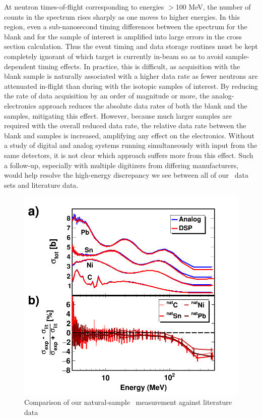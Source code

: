 At neutron times-of-flight corresponding to energies $>$100 MeV, the number of
counts in the spectrum rises sharply as one moves to higher energies. In this
region, even a sub-nanosecond timing differences between the spectrum for the
blank and for the sample of interest is amplified into large errors in the
cross section calculation. Thus the event timing and data
storage routines must be kept completely ignorant of which target is currently
in-beam so as to avoid sample-dependent timing effects. In practice, this is
difficult, as acquisition with the blank sample is naturally associated with
a higher data rate as fewer neutrons are attenuated in-flight than during
with the isotopic samples of interest. By reducing the rate of data acquisition
by an order of magnitude or more, the analog-electronics approach reduces the
absolute data rates of both the blank and the samples, mitigating this effect.
However, because much larger samples are required with the overall reduced data
rate, the relative data rate between the blank and samples is increased,
amplifying any effect on the electronics. Without a study of digital and analog
systems running simultaneously with input from the same detectors, it is not
clear which approach suffers more from this effect. Such a follow-up, especially
with multiple digitizers from differing manufacturers, would help
resolve the high-energy discrepancy we see between all of our \tot\ data sets
and literature data.

\begin{figure}
    \includegraphics[scale=0.5]{figures/literatureBenchmarking.png}
    \caption{Comparison of our natural-sample \tot\ measurement against literature data}
    \label{LiteratureBenchmarking}
\end{figure}

